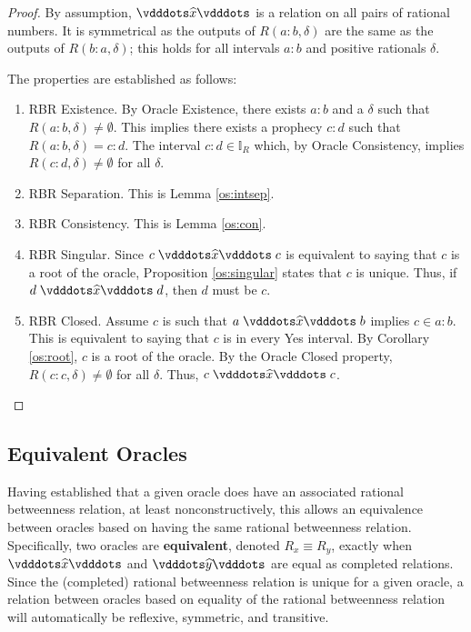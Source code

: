 \documentclass[12pt]{article}
\begin{document}
\begin{proof}
    By assumption, $\xora$ is a relation on all pairs of rational numbers. It is symmetrical as the outputs of $R(a:b, \delta)$ are the same as the outputs of $R(b:a, \delta)$; this holds for all intervals $a:b$ and positive rationals $\delta$.

    The properties are established as follows: 
    \begin{enumerate}
        \item RBR Existence. By Oracle Existence, there exists $a:b$  and a $\delta$ such that $R(a:b, \delta) \neq \emptyset$. This implies there exists a prophecy $c:d$ such that $R(a:b, \delta) = c:d$. The interval $c:d \in \mathbb{I}_R$ which, by Oracle Consistency, implies $R(c:d, \delta) \neq \emptyset$ for all $\delta$.  
        \item RBR Separation. This is Lemma \ref{os:intsep}.
        \item RBR Consistency. This is Lemma \ref{os:con}.
        \item RBR Singular. Since $c \xora c$ is equivalent to saying that $c$ is a root of the oracle, Proposition \ref{os:singular}  states that $c$ is unique. Thus, if $d \xora d$, then $d$ must be $c$. 
        \item RBR Closed. Assume $c$ is such that $a \xora b$ implies $c \in a:b$. This is equivalent to saying that $c$ is in every Yes interval. By Corollary \ref{os:root}, $c$ is a root of the oracle. By the Oracle Closed property, $R(c:c, \delta) \neq \emptyset$ for all $\delta$. Thus, $c \xora c$.
    \end{enumerate}
\end{proof}

\subsection{Equivalent Oracles}

Having established that a given oracle does have an associated rational betweenness relation, at least nonconstructively, this allows an equivalence between oracles based on having the same rational betweenness relation. Specifically, two oracles are \textbf{equivalent}, denoted $R_x \equiv R_y$, exactly when $\xora$ and $\xora[y]$ are equal as completed relations. Since the (completed) rational betweenness relation is unique for a given oracle, a relation between oracles based on equality of the rational betweenness relation will automatically be reflexive, symmetric, and transitive. 
\end{document}
